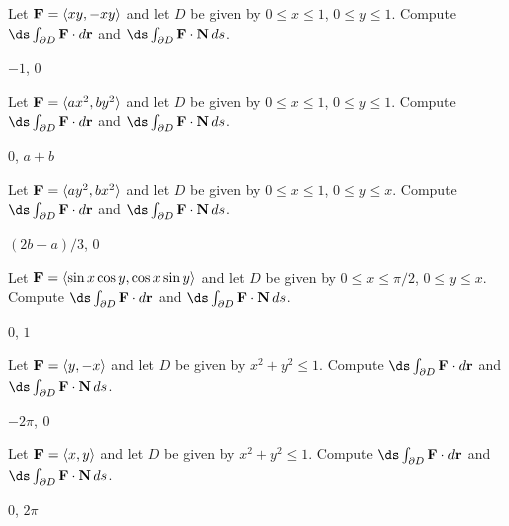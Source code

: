 \begin{exercises}

\begin{exercise} Let ${\bf F}=\langle xy,-xy\rangle$ and 
let $D$ be given by $0\le x\le 1$, $0\le y\le 1$.
Compute $\ds\int_{\partial D} {\bf F}\cdot d{\bf r}$ and
$\ds\int_{\partial D} {\bf F}\cdot{\bf N}\,ds$.
\begin{answer} $-1$, $0$
\end{answer}\end{exercise}

\begin{exercise} Let ${\bf F}=\langle ax^2,by^2\rangle$ and 
let $D$ be given by $0\le x\le 1$, $0\le y\le 1$.
Compute $\ds\int_{\partial D} {\bf F}\cdot d{\bf r}$ and
$\ds\int_{\partial D} {\bf F}\cdot{\bf N}\,ds$.
\begin{answer} $0$, $a+b$
\end{answer}\end{exercise}

\begin{exercise} Let ${\bf F}=\langle ay^2,bx^2\rangle$ and 
let $D$ be given by $0\le x\le 1$, $0\le y\le x$.
Compute $\ds\int_{\partial D} {\bf F}\cdot d{\bf r}$ and
$\ds\int_{\partial D} {\bf F}\cdot{\bf N}\,ds$.
\begin{answer} $(2b-a)/3$, $0$
\end{answer}\end{exercise}

\begin{exercise} Let ${\bf F}=\langle \sin x\cos y,\cos x\sin y\rangle$ and 
let $D$ be given by $0\le x\le \pi/2$, $0\le y\le x$.
Compute $\ds\int_{\partial D} {\bf F}\cdot d{\bf r}$ and
$\ds\int_{\partial D} {\bf F}\cdot{\bf N}\,ds$.
\begin{answer} $0$, $1$
\end{answer}\end{exercise}

\begin{exercise} Let ${\bf F}=\langle y,-x\rangle$ and 
let $D$ be given by $x^2+y^2\le 1$.
Compute $\ds\int_{\partial D} {\bf F}\cdot d{\bf r}$ and
$\ds\int_{\partial D} {\bf F}\cdot{\bf N}\,ds$.
\begin{answer} $-2\pi$, $0$
\end{answer}\end{exercise}

\begin{exercise} Let ${\bf F}=\langle x,y\rangle$ and 
let $D$ be given by $x^2+y^2\le 1$.
Compute $\ds\int_{\partial D} {\bf F}\cdot d{\bf r}$ and
$\ds\int_{\partial D} {\bf F}\cdot{\bf N}\,ds$.
\begin{answer} $0$, $2\pi$
\end{answer}\end{exercise}


\end{exercises}
